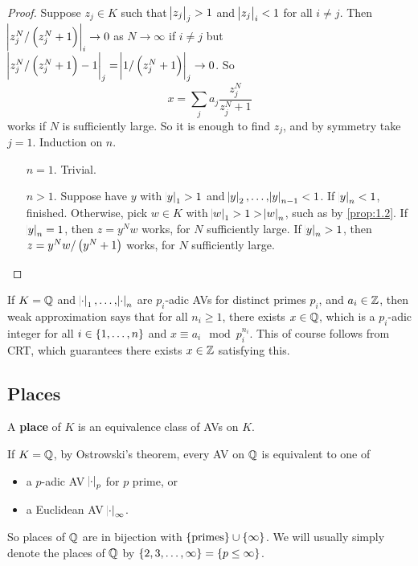 \begin{proof}
Suppose $ z_j \in K $ such that $ \abs{z_j}_j > 1 $ and $ \abs{z_j}_i < 1 $ for all $ i \ne j $. Then $ \abs{z_j^N / \br{z_j^N + 1}}_i \to 0 $ as $ N \to \infty $ if $ i \ne j $ but $ \abs{z_j^N / \br{z_j^N + 1} - 1}_j = \abs{1 / \br{z_j^N + 1}}_j \to 0 $. So
$$ x = \sum_j a_j\dfrac{z_j^N}{z_j^N + 1} $$
works if $ N $ is sufficiently large. So it is enough to find $ z_j $, and by symmetry take $ j = 1 $. Induction on $ n $.
\begin{itemize}[leftmargin=0.5in]
\item[$ n = 1 $.] Trivial.
\item[$ n > 1 $.] Suppose have $ y $ with $ \abs{y}_1 > 1 $ and $ \abs{y}_2, \dots, \abs{y}_{n - 1} < 1 $. If $ \abs{y}_n < 1 $, finished. Otherwise, pick $ w \in K $ with $ \abs{w}_1 > 1 > \abs{w}_n $, such as by \ref{prop:1.2}. If $ \abs{y}_n = 1 $, then $ z = y^Nw $ works, for $ N $ sufficiently large. If $ \abs{y}_n > 1 $, then $ z = y^Nw / \br{y^N + 1} $ works, for $ N $ sufficiently large.
\end{itemize}
\end{proof}

\begin{remark*}
If $ K = \mathbb{Q} $ and $ \abs{\cdot}_1, \dots, \abs{\cdot}_n $ are $ p_i $-adic AVs for distinct primes $ p_i $, and $ a_i \in \mathbb{Z} $, then weak approximation says that for all $ n_i \ge 1 $, there exists $ x \in \mathbb{Q} $, which is a $ p_i $-adic integer for all $ i \in \cbr{1, \dots, n} $ and $ x \equiv a_i \mod p_i^{n_i} $. This of course follows from CRT, which guarantees there exists $ x \in \mathbb{Z} $ satisfying this.
\end{remark*}

\subsection{Places}

\begin{definition*}
A \textbf{place} of $ K $ is an equivalence class of AVs on $ K $.
\end{definition*}

\begin{example*}
If $ K = \mathbb{Q} $, by Ostrowski's theorem, every AV on $ \mathbb{Q} $ is equivalent to one of
\begin{itemize}
\item a $ p $-adic AV $ \abs{\cdot}_p $ for $ p $ prime, or
\item a Euclidean AV $ \abs{\cdot}_\infty $.
\end{itemize}
So places of $ \mathbb{Q} $ are in bijection with $ \cbr{\text{primes}} \cup \cbr{\infty} $. We will usually simply denote the places of $ \mathbb{Q} $ by $ \cbr{2, 3, \dots, \infty} = \cbr{p \le \infty} $.
\end{example*}

